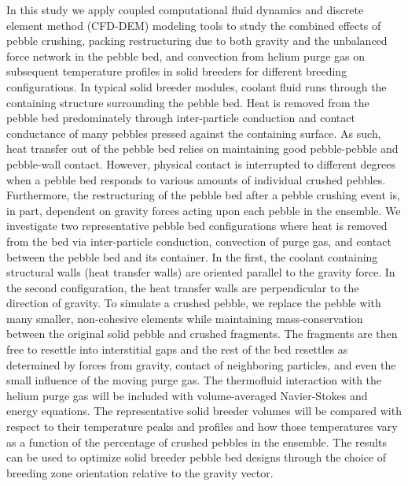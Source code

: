 In this study we apply coupled computational fluid dynamics and discrete element method (CFD-DEM) modeling tools to study the combined effects of pebble crushing, packing restructuring due to both gravity and the unbalanced force network in the pebble bed, and convection from helium purge gas on subsequent temperature profiles in solid breeders for different breeding configurations. In typical solid breeder modules, coolant fluid runs through the containing structure surrounding the pebble bed. Heat is removed from the pebble bed predominately through inter-particle conduction and contact conductance of many pebbles pressed against the containing surface. As such, heat transfer out of the pebble bed relies on maintaining good pebble-pebble and pebble-wall contact. However, physical contact is interrupted to different degrees when a pebble bed responds to various amounts of individual crushed pebbles. Furthermore, the restructuring of the pebble bed after a pebble crushing event is, in part, dependent on gravity forces acting upon each pebble in the ensemble. We investigate two representative pebble bed configurations where heat is removed from the bed via inter-particle conduction, convection of purge gas, and contact between the pebble bed and its container. In the first, the coolant containing structural walls (heat transfer walls) are oriented parallel to the gravity force. In the second configuration, the heat transfer walls are perpendicular to the direction of gravity. To simulate a crushed pebble, we replace the pebble with many smaller, non-cohesive elements while maintaining mass-conservation between the original solid pebble and crushed fragments. The fragments are then free to resettle into interstitial gaps and the rest of the bed resettles as determined by forces from gravity, contact of neighboring particles, and even the small influence of the moving purge gas. The thermofluid interaction with the helium purge gas will be included with volume-averaged Navier-Stokes and energy equations. The representative solid breeder volumes will be compared with respect to their temperature peaks and profiles and how those temperatures vary as a function of the percentage of crushed pebbles in the ensemble. The results can be used to optimize solid breeder pebble bed designs through the choice of breeding zone orientation relative to the gravity vector.